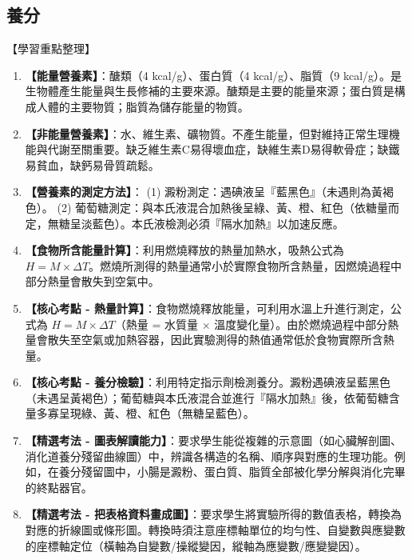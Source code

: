 \documentclass[11pt,a4paper]{article}
\begin{document}
\subsection{養分}
\begin{learningpoints}{【學習重點整理】}
\begin{enumerate}[label=\arabic*.]
  \item \textbf{【能量營養素】}：醣類（4 kcal/g）、蛋白質（4 kcal/g）、脂質（9 kcal/g）。是生物體產生能量與生長修補的主要來源。醣類是主要的能量來源；蛋白質是構成人體的主要物質；脂質為儲存能量的物質。
  \item \textbf{【非能量營養素】}：水、維生素、礦物質。不產生能量，但對維持正常生理機能與代謝至關重要。缺乏維生素C易得壞血症，缺維生素D易得軟骨症；缺鐵易貧血，缺鈣易骨質疏鬆。
  \item \textbf{【營養素的測定方法】}：
  (1) 澱粉測定：遇碘液呈『藍黑色』（未遇則為黃褐色）。
  (2) 葡萄糖測定：與本氏液混合加熱後呈綠、黃、橙、紅色（依糖量而定，無糖呈淡藍色）。本氏液檢測必須『隔水加熱』以加速反應。
  \item \textbf{【食物所含能量計算】}：利用燃燒釋放的熱量加熱水，吸熱公式為 $H = M \times \Delta T$。燃燒所測得的熱量通常小於實際食物所含熱量，因燃燒過程中部分熱量會散失到空氣中。
  \item \textbf{【核心考點 - 熱量計算】}：食物燃燒釋放能量，可利用水溫上升進行測定，公式為 $H = M \times \Delta T$（熱量 = 水質量 $\times$ 溫度變化量）。由於燃燒過程中部分熱量會散失至空氣或加熱容器，因此實驗測得的熱值通常低於食物實際所含熱量。
  \item \textbf{【核心考點 - 養分檢驗】}：利用特定指示劑檢測養分。澱粉遇碘液呈藍黑色（未遇呈黃褐色）；葡萄糖與本氏液混合並進行『隔水加熱』後，依葡萄糖含量多寡呈現綠、黃、橙、紅色（無糖呈藍色）。
  \item \textbf{【精選考法 - 圖表解讀能力】}：要求學生能從複雜的示意圖（如心臟解剖圖、消化道養分殘留曲線圖）中，辨識各構造的名稱、順序與對應的生理功能。例如，在養分殘留圖中，小腸是澱粉、蛋白質、脂質全部被化學分解與消化完畢的終點器官。
  \item \textbf{【精選考法 - 把表格資料畫成圖】}：要求學生將實驗所得的數值表格，轉換為對應的折線圖或條形圖。轉換時須注意座標軸單位的均勻性、自變數與應變數的座標軸定位（橫軸為自變數/操縱變因，縱軸為應變數/應變變因）。
\end{enumerate}
\end{learningpoints}
\end{document}
